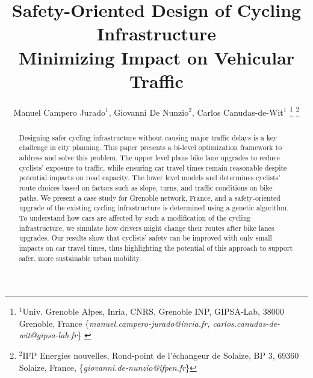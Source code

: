 \documentclass[letterpaper, 10 pt, conference]{ieeeconf}  %
\title{\LARGE \bf Safety-Oriented Design of Cycling Infrastructure\\Minimizing Impact on Vehicular Traffic}
\author{Manuel Campero Jurado$^{1}$, Giovanni De Nunzio$^{2}$, Carlos Canudas-de-Wit$^{1}$ %
\thanks{$^{1}$Univ. Grenoble Alpes, Inria, CNRS, Grenoble INP, GIPSA-Lab, 38000 Grenoble, France
        {\footnotesize \{\textit{manuel.campero-jurado@inria.fr, carlos.canudas-de-wit@gipsa-lab.fr}\} }}%
\thanks{$^{2}$IFP Energies nouvelles,
Rond-point de l’échangeur de Solaize, BP 3, 69360 Solaize, France,
        {\footnotesize \{\textit{giovanni.de-nunzio@ifpen.fr}\}}}%
%
}
\begin{document}
\maketitle
\pagestyle{empty}


\begin{abstract}
Designing safer cycling infrastructure without causing major traffic delays is a key challenge in city planning. This paper presents a bi-level optimization framework to address and solve this problem. The upper level plans bike lane upgrades to reduce cyclists' exposure to traffic, while ensuring car travel times remain reasonable despite potential impacts on road capacity. The lower level models and determines cyclists’ route choices based on factors such as slope, turns, and traffic conditions on bike paths. We present a case study for Grenoble network, France, and a safety-oriented upgrade of the existing cycling infrastructure is determined using a genetic algorithm. To understand how cars are affected by such a modification of the cycling infrastructure, we simulate how drivers might change their routes after bike lanes upgrades. Our results show that cyclists' safety can be improved with only small impacts on car travel times, thus highlighting the potential of this approach to support safer, more sustainable urban mobility.
\end{abstract}
\end{document}
